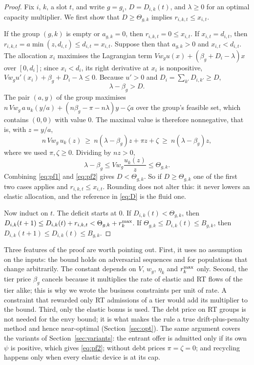 \begin{proof}
Fix $i$, $k$, a slot $t$, and write $g=g_i$, $D=D_{i,k}(t)$, and $\lambda\ge0$ for an optimal capacity multiplier.
We first show that $D\ge\Theta_{g,k}$ implies $r_{i,k,t}\le x_{i,t}$.

If the group $(g,k)$ is empty or $a_{g,k}=0$, then $r_{i,k,t}=0\le x_{i,t}$.
If $x_{i,t}=d_{i,t}$, then $r_{i,k,t}=a\min(z,d_{i,t})\le d_{i,t}=x_{i,t}$.
Suppose then that $a_{g,k}>0$ and $x_{i,t}<d_{i,t}$.
The allocation $x_i$ maximises the Lagrangian term $Vw_gu(x)+(\beta_g+D_i-\lambda)x$ over $[0,d_i]$; since $x_i<d_i$, its right derivative at $x_i$ is nonpositive, $Vw_gu'(x_i)+\beta_g+D_i-\lambda\le0$. Because $u'>0$ and $D_i=\sum_{k'}D_{i,k'}\ge D$,
\begin{equation}\label{eq:pf1}
\lambda-\beta_g>D .
\end{equation}
The pair $(a,y)$ of the group maximises $n\,Vw_g\,a\,u_k(y/a)+(n\beta_g-\pi-n\lambda)y-\zeta a$ over the group's feasible set, which contains $(0,0)$ with value $0$. The maximal value is therefore nonnegative, that is, with $z=y/a$,
\[
n\,Vw_g\,u_k(z)\ \ge\ n(\lambda-\beta_g)z+\pi z+\zeta\ \ge\ n(\lambda-\beta_g)z ,
\]
where we used $\pi,\zeta\ge0$. Dividing by $nz>0$,
\begin{equation}\label{eq:pf2}
\lambda-\beta_g\le Vw_g\frac{u_k(z)}{z}\le\Theta_{g,k}.
\end{equation}
Combining \eqref{eq:pf1} and \eqref{eq:pf2} gives $D<\Theta_{g,k}$.
So if $D\ge\Theta_{g,k}$ one of the first two cases applies and $r_{i,k,t}\le x_{i,t}$.
Rounding does not alter this: it never lowers an elastic allocation, and the reference in \eqref{eq:D} is the fluid one.

Now induct on $t$. The deficit starts at $0$. If $D_{i,k}(t)<\Theta_{g,k}$, then $D_{i,k}(t+1)\le D_{i,k}(t)+r_{i,k,t}<\Theta_{g,k}+r^{\max}_k$. If $\Theta_{g,k}\le D_{i,k}(t)\le B_{g,k}$, then $D_{i,k}(t+1)\le D_{i,k}(t)\le B_{g,k}$.
\end{proof}

Three features of the proof are worth pointing out.
First, it uses no assumption on the inputs: the bound holds on adversarial sequences and for populations that change arbitrarily. The constant depends on $V$, $w_g$, $\eta_k$ and $r^{\max}_k$ only.
Second, the tier price $\beta_g$ cancels because it multiplies the rate of elastic and RT flows of the tier alike; this is why we wrote the business constraints per unit of rate. A constraint that rewarded only RT admissions of a tier would add its multiplier to the bound.
Third, only the elastic bonus is used. The debt price on RT groups is not needed for the envy bound; it is what makes the rule a true drift-plus-penalty method and hence near-optimal (Section~\ref{sec:opt}).
The same argument covers the variants of Section~\ref{sec:variants}: the entrant offer is admitted only if its own $\psi$ is positive, which gives \eqref{eq:pf2}; without debt prices $\pi=\zeta=0$; and recycling happens only when every elastic device is at its cap.

